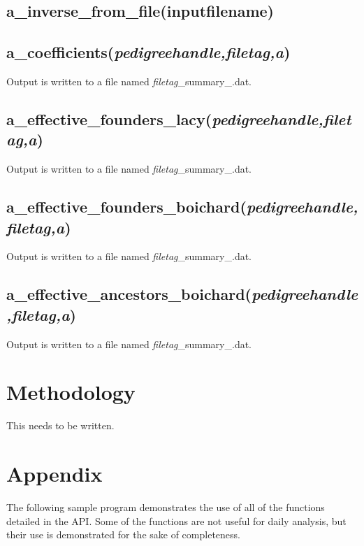 \subsection{a\_inverse\_from\_file(inputfilename)}

\subsection{a\_coefficients(\textit{pedigreehandle,filetag,a})}
Output is written to a file named \textit{filetag}\_summary\_.dat.

\subsection{a\_effective\_founders\_lacy(\textit{pedigreehandle,filetag,a})}
Output is written to a file named \textit{filetag}\_summary\_.dat.

\subsection{a\_effective\_founders\_boichard(\textit{pedigreehandle,filetag,a})}
Output is written to a file named \textit{filetag}\_summary\_.dat.

\subsection{a\_effective\_ancestors\_boichard(\textit{pedigreehandle,filetag,a})}
Output is written to a file named \textit{filetag}\_summary\_.dat.

\section{Methodology}
This needs to be written.

\section*{Appendix}
The following sample program demonstrates the use of all of the functions detailed in the API.  Some of the functions are not useful for daily analysis, but their use is demonstrated for the sake of completeness.

